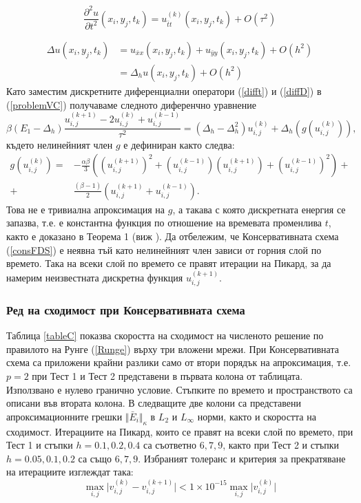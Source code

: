 \documentclass{article}
\newcommand{\be}{\begin{equation}}
\newcommand{\ee}{\end{equation}}
\newcommand{\rf}[1]{(\ref{#1})}
\theoremstyle{remark}
\begin{document}
\be\label{difft}
\frac{\partial^2 u}{\partial t^2}(x_i, y_j, t_k ) = u^{(k)}_{\bar{t}t}(x_i, y_j, t_k ) + O(\tau^2) 
\ee

\begin{align}\label{diffD}
\Delta u(x_i, y_j, t_k )  &= u_{\bar{x}x}(x_i, y_j, t_k ) +  u_{\bar{y}y}(x_i, y_j, t_k ) +  O(h^2)  \nonumber\\
			      &= \Delta_h u(x_i, y_j, t_k ) +  O(h^2) 
\end{align}
Като заместим дискретните диференциални оператори \rf{difft} и \rf{diffD} в \rf{problemVC} получаваме следното диференчно уравнение
\be\label{consFDS}
\beta (E_1-\Delta_h)\frac{ u^{(k+1)}_{i, j} - 2u^{(k)}_{i,j} + u^{(k-1)}_{i,j} }{\tau^2} = (\Delta_h - \Delta_h^2)u^{(k)}_{i,j} + \Delta_h(g(u^{(k)}_{i,j})),
\ee
%
където нелинейният член $g$ е дефиниран както следва:
\begin{align}
g(u^{(k)}_{i,j})=& -\frac{\alpha \beta} { 3 } \left( (u^{(k+1)}_{i,j})^2 + (u^{(k-1)}_{i,j})(u^{(k+1)}_{i,j}) + (u^{(k-1)}_{i,j})^2 \right) + \nonumber\\
+&\frac{ (\beta - 1 )}{ 2 }\left( u^{(k+1)}_{i,j} + u^{(k-1)}_{i,j} \right).
\end{align}
Това не е тривиална апроксимация на $g$, а такава с която дискретната енергия се запазва, т.е. е константна функция по отношение на времевата променлива $t$, както е доказано в Теорема 1 (виж \cite{ref20}). Да отбележим, че Консервативната схема \rf{consFDS} е неявна тъй като нелинейният член зависи от горния слой по времето. Така на всеки слой по времето се правят итерации на Пикард, за да намерим неизвестната дискретна функция $u^{(k+1)}_{i,j}$.

\subsubsection{Ред на сходимост при Консервативната схема}
Таблица \ref{tableC} показва скоростта на сходимост на численото решение по правилото на Рунге \rf{Runge} върху три вложени мрежи. При Консервативната схема са приложени крайни разлики само от втори порядък на апроксимация, т.е. $p=2$ при Тест 1 и Тест 2 представени в първата колона от таблицата. Използвано е нулево гранично условие. Стъпките по времето и пространството са описани във втората колона. В следващите две колони са представени апроксимационните грешки  $\Vert \bar E_i \Vert_\kappa$ в $L_2$ и $L_{\infty}$ норми, както и скоростта на сходимост. Итерациите на Пикард, които се правят на всеки слой по времето, при Тест 1 и стъпки $h=0.1, 0.2, 0.4$ са съответно $6, 7, 9$, както при Тест 2 и стъпки $h=0.05, 0.1, 0.2$ са също $6, 7, 9$. Избраният толеранс и критерия за прекратяване на итерациите изглеждат така:
\be
\max_{i,j} \vert v_{i,j}^{(k)} - v_{i,j}^{(k+1)} \vert < 1 \times 10^{-15} \max_{i,j} \vert v_{i,j}^{(k)} \vert
\ee
\end{document}
